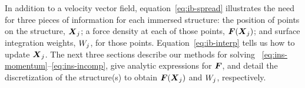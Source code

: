 In addition to a velocity vector field, equation~\eqref{eq:ib-spread} illustrates the
need for three pieces of information for each immersed structure: the position of points
on the structure, $\boldsymbol{X}_j$; a force density at each of those points, $\boldsymbol{F}(\boldsymbol{X}_j)$; and
surface integration weights, $\weight[j]$, for those points. Equation~\eqref{eq:ib-interp}
tells us how to update $\boldsymbol{X}_j$. The next three sections describe our methods for solving~%
\eqref{eq:ins-momentum}--\eqref{eq:ins-incomp}, give analytic expressions for $\boldsymbol{F}$, and
detail the discretization of the structure(s) to obtain $\boldsymbol{F}(\boldsymbol{X}_j)$ and $\weight[j]$,
respectively.
